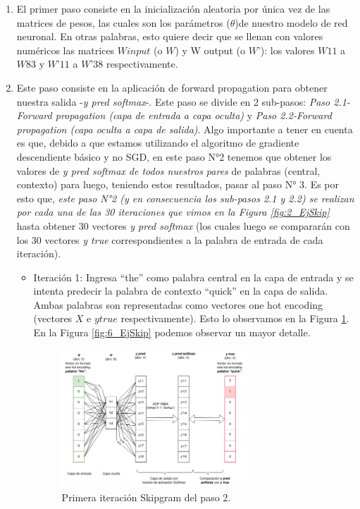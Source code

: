 \documentclass[12pt,a4paper]{article}
\begin{document}
\begin{sloppypar}
\begin{enumerate}
\item El primer paso consiste en la inicialización aleatoria por única vez de las matrices de pesos, las cuales son los parámetros ($\theta$)de nuestro modelo de red neuronal. En otras palabras, esto quiere decir que se llenan con valores numéricos las matrices $W input$ (o $W$) y W output (o $W’$): los valores $W11$ a $W83$ y $W’11$ a $W’38$ respectivamente.
\item Este paso consiste en la aplicación de forward propagation para obtener nuestra salida -\textit{y pred softmax}-. Este paso se divide en 2 sub-pasos: \textit{Paso 2.1-Forward propagation (capa de entrada a capa oculta)} y \textit{Paso 2.2-Forward propagation (capa oculta a capa de salida)}.
Algo importante a tener en cuenta es que, debido a que estamos utilizando el algoritmo de gradiente descendiente básico y no SGD, en este paso N°2 tenemos que obtener los valores de \textit{y pred softmax de todos nuestros pares} de palabras (central, contexto) para luego, teniendo estos resultados, pasar al paso N° 3. Es por esto que, \textit{este paso N°2 (y en consecuencia los sub-pasos 2.1 y 2.2) se realizan por cada una de las 30 iteraciones que vimos en la Figura \ref{fig:2_EjSkip} } hasta obtener 30 vectores \textit{y pred softmax} (los cuales luego se compararán con los 30 vectores \textit{y true} correspondientes a la palabra de entrada de cada iteración).
      \begin{itemize}
      
      \item Iteración 1: Ingresa “the” como palabra central en la capa de entrada y se intenta predecir la palabra de contexto “quick” en la capa de salida. Ambas palabras son representadas como vectores one hot encoding (vectores $X$ e $y true$ respectivamente). Esto lo observamos en la Figura \ref{fig:5_EjSkip}. En la Figura \ref{fig:6_EjSkip} podemos observar un mayor detalle. 

\begin{figure}[H]    %
\centering
\includegraphics[width=0.7\textwidth]{images/Ejemplo_Skipgram/5_EjSkip.png}
\caption{Primera iteración Skipgram del paso 2.} 
\label{fig:5_EjSkip}
\end{figure}


\end{itemize}
\end{enumerate}
\end{sloppypar}
\end{document}
